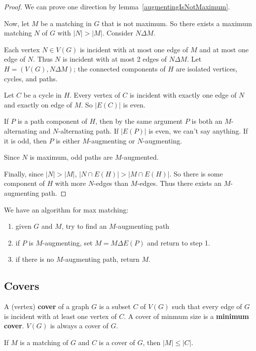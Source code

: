 \documentclass[12pt]{article}
\begin{document}
\begin{proof}
We can prove one direction by lemma~\ref{augmentingIsNotMaximum}.

Now, let $M$ be a matching in $G$ that is not maximum. So there exists a maximum matching $N$ of $G$ with $|N| > |M|$. Consider $N \Delta M$.

Each vertex $N \in V(G)$ is incident with at most one edge of $M$ and at most one edge of $N$. Thus $N$ is incident with at most 2 edges of $N \Delta M$. Let $H = (V(G), N \Delta M)$; the connected components of $H$ are isolated vertices, cycles, and paths.

Let $C$ be a cycle in $H$. Every vertex of $C$ is incident with exactly one edge of $N$ and exactly on edge of $M$. So $|E(C)|$ is even.

If $P$ is a path component of $H$, then by the same argument $P$ is both an $M$-alternating and $N$-alternating path. If $|E(P)|$ is even, we can't say anything. If it is odd, then $P$ is either $M$-augmenting or $N$-augmenting.

Since $N$ is maximum, odd paths are $M$-augmented.

Finally, since $|N| > |M|$, $|N \cap E(H)| > |M \cap E(H)|$. So there is some component of $H$ with more $N$-edges than $M$-edges. Thus there exists an $M$-augmenting path.
\end{proof}

We have an algorithm for max matching:
\begin{enumerate}
\item given $G$ and $M$, try to find an $M$-augmenting path
\item if $P$ is $M$-augmenting, set $M = M \Delta E(P)$ and return to step 1.
\item if there is no $M$-augmenting path, return $M$.
\end{enumerate}

\subsection{Covers}
A (vertex) {\bf cover} of a graph $G$ is a subset $C$ of $V(G)$ such that every edge of $G$ is incident with at least one vertex of $C$. A cover of minmum size is a {\bf minimum cover}. $V(G)$ is always a cover of $G$.

\begin{lemma}
\label{matchingLeqCover}
If $M$ is a matching of $G$ and $C$ is a cover of $G$, then $|M| \leq |C|$.
\end{lemma}
\end{document}
